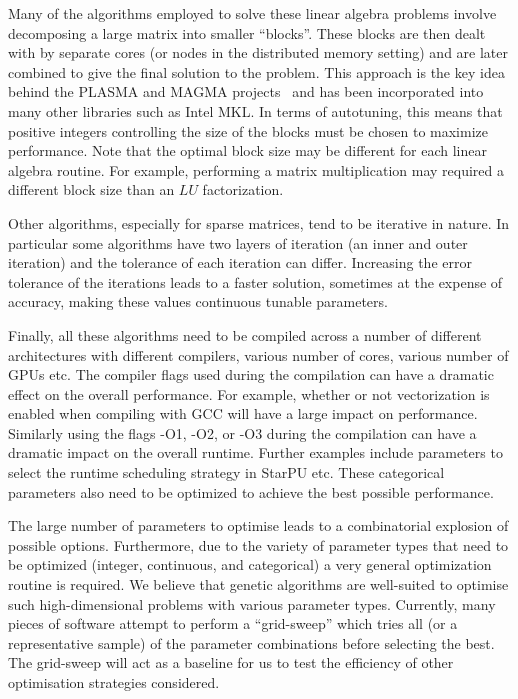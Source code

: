 \documentclass[a4paper,12pt]{article}
\begin{document}
Many of the algorithms employed to solve these linear algebra problems
involve decomposing a large matrix into smaller ``blocks''.  These
blocks are then dealt with by separate cores (or nodes in the
distributed memory setting) and are later combined to give the final
solution to the problem.  This approach is the key idea behind the
PLASMA and MAGMA projects~\cite{addh09} and has been incorporated into
many other libraries such as Intel MKL.  In terms of autotuning, this
means that positive integers controlling the size of the blocks must
be chosen to maximize performance.  Note that the optimal block size
may be different for each linear algebra routine.  For example,
performing a matrix multiplication may required a different block size
than an $LU$ factorization.

Other algorithms,
especially for sparse matrices,
tend to be iterative in nature.
In particular some algorithms have two layers of iteration
(an inner and outer iteration)
and the tolerance of each iteration can differ.
Increasing the error tolerance of the iterations
leads to a faster solution,
sometimes at the expense of accuracy,
making these values continuous tunable parameters.

Finally,
all these algorithms need to be compiled across a number of different
architectures with
different compilers, various number of cores, various number of GPUs etc.
The compiler flags used during the compilation can have a dramatic
effect on the overall performance.
For example,
whether or not vectorization is enabled when compiling with GCC will
have a large impact on performance.
Similarly using the flags -O1, -O2, or -O3 during the compilation can have a
dramatic impact on the overall runtime.
Further examples include parameters to select the runtime scheduling
strategy in StarPU etc.
These categorical parameters also need to be optimized to
achieve the best possible performance.

The large number of parameters to optimise leads to a combinatorial
explosion of possible options.
Furthermore,
due to the variety of parameter types that need to be optimized
(integer, continuous, and categorical)
a very general optimization routine is required.
We believe that genetic algorithms are well-suited to optimise
such high-dimensional problems with various parameter types.
Currently,
many pieces of software attempt to perform a ``grid-sweep''
which tries all (or a representative sample)
of the parameter combinations before selecting the best.
The grid-sweep will act as a baseline for us to test the efficiency of
other optimisation strategies considered.
\end{document}
